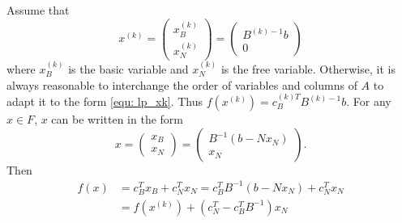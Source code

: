 Assume that  
\begin{equation*}
    \label{equ: lp_xk}
    x^{(k)} = \begin{pmatrix}
        x_B^{(k)} \\
        x_N^{(k)}
    \end{pmatrix} = 
    \begin{pmatrix}
        B^{(k)-1}b \\
        0
    \end{pmatrix}
\end{equation*}
where $x_B^{(k)}$ is the basic variable and $x_N^{(k)}$ is the free 
variable. Otherwise, it is always reasonable to interchange the order of 
variables and columns of $A$ to adapt it to the form \ref{equ: lp_xk}.
Thus $f(x^{(k)}) = c_B^{(k)T} B^{(k)-1}b$. For any $x \in F$, $x$ can be 
written in the form 
\begin{equation}
    x = \begin{pmatrix}
        x_B \\
        x_N
    \end{pmatrix}
    = \begin{pmatrix}
        B^{-1}(b - Nx_N) \\
        x_N
    \end{pmatrix}.
\end{equation}
Then 
\begin{equation*}
    \begin{aligned}
        f(x) 
        &= c_B^{T} x_B + c_N^T x_N 
        = c_B^T B^{-1}(b - N x_N) + c_N^T x_N \\
        &= f(x^{(k)}) + (c_N^T - c_B^T B^{-1})x_N
    \end{aligned}
\end{equation*}